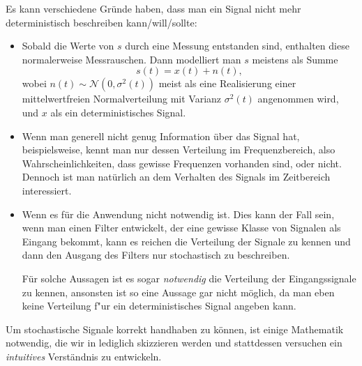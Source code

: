 Es kann verschiedene Gründe haben, dass man ein Signal nicht mehr deterministisch beschreiben kann/will/sollte:
%
\begin{itemize}
    \item Sobald die Werte von $s$ durch eine Messung entstanden sind, enthalten diese normalerweise Messrauschen.
    Dann modelliert man $s$ meistens als Summe
    \[
    s(t) = x(t) + n(t),
    \]
    wobei $n(t) \sim \mathcal{N}(0, \sigma^2(t))$ meist als eine Realisierung einer mittelwertfreien Normalverteilung mit Varianz $\sigma^2(t)$ angenommen wird, und $x$ als ein deterministisches Signal.
    \item Wenn man generell nicht genug Information über das Signal hat, beispielsweise, kennt man nur dessen Verteilung im Frequenzbereich, also Wahrscheinlichkeiten, dass gewisse Frequenzen vorhanden sind, oder nicht.
    Dennoch ist man natürlich an dem Verhalten des Signals im Zeitbereich interessiert.
    \item Wenn es für die Anwendung nicht notwendig ist.
    Dies kann der Fall sein, wenn man einen Filter entwickelt, der eine gewisse Klasse von Signalen als Eingang bekommt, kann es reichen die Verteilung der Signale zu kennen und dann den Ausgang des Filters nur stochastisch zu beschreiben.


    Für solche Aussagen ist es sogar \emph{notwendig} die Verteilung der Eingangssignale zu kennen, ansonsten ist so eine Aussage gar nicht möglich, da man eben keine Verteilung f"ur ein deterministisches Signal angeben kann.
\end{itemize}
%
%
Um stochastische Signale korrekt handhaben zu können, ist einige Mathematik notwendig, die wir in  lediglich skizzieren werden und stattdessen versuchen ein \emph{intuitives} Verständnis zu entwickeln.
%
%
